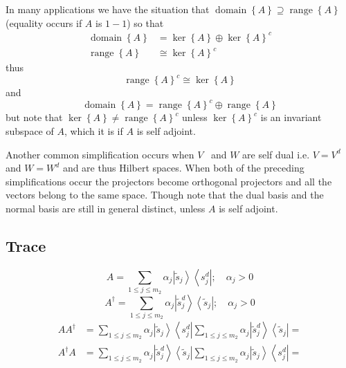 \documentclass[aps,preprint]{revtex4}%
\begin{document}
In many applications we have the situation that $\operatorname{domain}\left\{
A\right\}  \supseteq\operatorname{range}\left\{  A\right\}  $ (equality occurs
if $A$ is $1-1$) so that
\begin{align}
\operatorname{domain}\left\{  A\right\}   & =\ker\left\{  A\right\}
\oplus\ker\left\{  A\right\}  ^{c}\nonumber\\
\operatorname{range}\left\{  A\right\}   & \cong\ker\left\{  A\right\}  ^{c}%
\end{align}
thus
\begin{equation}
\operatorname{range}\left\{  A\right\}  ^{c}\cong\ker\left\{  A\right\}
\end{equation}
and
\begin{equation}
\operatorname{domain}\left\{  A\right\}  =\operatorname{range}\left\{
A\right\}  ^{c}\oplus\operatorname{range}\left\{  A\right\}
\end{equation}
but note that $\ker\left\{  A\right\}  \neq\operatorname{range}\left\{
A\right\}  ^{c}$ unless $\ker\left\{  A\right\}  ^{c}$ is an invariant
subspace of $A$, which it is if $A$ is self adjoint.

Another common simplification occurs when $V$ \ and $W$ are self dual i.e.
$V=V^{d}$ and $W=W^{d}$ and are thus Hilbert spaces. When both of the
preceding simplifications occur the projectors become orthogonal projectors
and all the vectors belong to the same space. Though note that the dual basis
and the normal basis are still in general distinct, unless $A$ is self adjoint.

\subsection{Trace}%

\begin{equation}
A=\sum_{1\leq j\leq m_{2}}\alpha_{j}\left\vert \tilde{s}_{j}\right\rangle
\left\langle s_{j}^{d}\right\vert ;\quad\alpha_{j}>0
\end{equation}%
\begin{equation}
A^{\dagger}=\sum_{1\leq j\leq m_{2}}\alpha_{j}\left\vert \tilde{s}_{j}%
^{d}\right\rangle \left\langle \tilde{s}_{j}\right\vert ;\quad\alpha_{j}>0
\end{equation}%
\begin{align*}
AA^{\dagger}  & =\sum_{1\leq j\leq m_{2}}\alpha_{j}\left\vert \tilde{s}%
_{j}\right\rangle \left\langle s_{j}^{d}\right\vert \sum_{1\leq j\leq m_{2}%
}\alpha_{j}\left\vert \tilde{s}_{j}^{d}\right\rangle \left\langle \tilde
{s}_{j}\right\vert =\\
A^{\dagger}A  & =\sum_{1\leq j\leq m_{2}}\alpha_{j}\left\vert \tilde{s}%
_{j}^{d}\right\rangle \left\langle \tilde{s}_{j}\right\vert \sum_{1\leq j\leq
m_{2}}\alpha_{j}\left\vert \tilde{s}_{j}\right\rangle \left\langle s_{j}%
^{d}\right\vert =
\end{align*}
\end{document}
